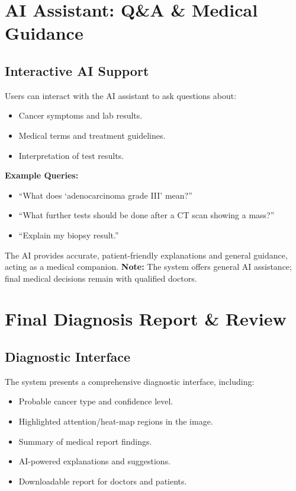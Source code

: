 \documentclass[a4paper,12pt]{report}
\begin{document}
\begin{doublespace}
\section{AI Assistant: Q\&A \& Medical Guidance}
\subsection*{Interactive AI Support}
Users can interact with the AI assistant to ask questions about:
\begin{itemize}
    \item Cancer symptoms and lab results.
    \item Medical terms and treatment guidelines.
    \item Interpretation of test results.
\end{itemize}
\textbf{Example Queries:}
\begin{itemize}
    \item “What does ‘adenocarcinoma grade III’ mean?”
    \item “What further tests should be done after a CT scan showing a mass?”
    \item “Explain my biopsy result.”
\end{itemize}
The AI provides accurate, patient-friendly explanations and general guidance, acting as a medical companion. \textbf{Note:} The system offers general AI assistance; final medical decisions remain with qualified doctors.

\section{Final Diagnosis Report \& Review}
\subsection*{Diagnostic Interface}
The system presents a comprehensive diagnostic interface, including:
\begin{itemize}
    \item Probable cancer type and confidence level.
    \item Highlighted attention/heat-map regions in the image.
    \item Summary of medical report findings.
    \item AI-powered explanations and suggestions.
    \item Downloadable report for doctors and patients.
\end{itemize}


\end{doublespace}
\end{document}
